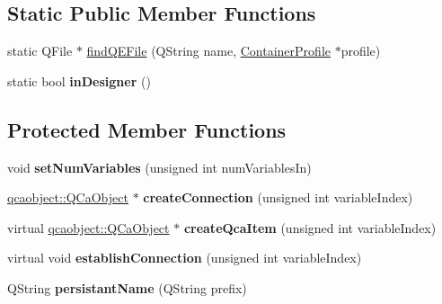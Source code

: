 \subsection*{Static Public Member Functions}
\begin{DoxyCompactItemize}
\item 
static QFile $\ast$ \hyperlink{classQEWidget_adc57be41e71241cccfd419e0f18e9823}{findQEFile} (QString name, \hyperlink{classContainerProfile}{ContainerProfile} $\ast$profile)
\item 
\hypertarget{classQEWidget_a9925e2a5466a753ebd366d770b27dc92}{
static bool {\bfseries inDesigner} ()}
\label{classQEWidget_a9925e2a5466a753ebd366d770b27dc92}

\end{DoxyCompactItemize}
\subsection*{Protected Member Functions}
\begin{DoxyCompactItemize}
\item 
\hypertarget{classQEWidget_a8ad4dd7634fb1444bcd1366b01d2643e}{
void {\bfseries setNumVariables} (unsigned int numVariablesIn)}
\label{classQEWidget_a8ad4dd7634fb1444bcd1366b01d2643e}

\item 
\hypertarget{classQEWidget_a44752031c605215a59151f4995515666}{
\hyperlink{classqcaobject_1_1QCaObject}{qcaobject::QCaObject} $\ast$ {\bfseries createConnection} (unsigned int variableIndex)}
\label{classQEWidget_a44752031c605215a59151f4995515666}

\item 
\hypertarget{classQEWidget_a973906d788744e10e970cf30c71bf516}{
virtual \hyperlink{classqcaobject_1_1QCaObject}{qcaobject::QCaObject} $\ast$ {\bfseries createQcaItem} (unsigned int variableIndex)}
\label{classQEWidget_a973906d788744e10e970cf30c71bf516}

\item 
\hypertarget{classQEWidget_a0a181869258d8587e200eaa369186162}{
virtual void {\bfseries establishConnection} (unsigned int variableIndex)}
\label{classQEWidget_a0a181869258d8587e200eaa369186162}

\item 
\hypertarget{classQEWidget_ab8dc86445dc1eb4f3ce4b9f43c45c589}{
QString {\bfseries persistantName} (QString prefix)}
\label{classQEWidget_ab8dc86445dc1eb4f3ce4b9f43c45c589}

\end{DoxyCompactItemize}
